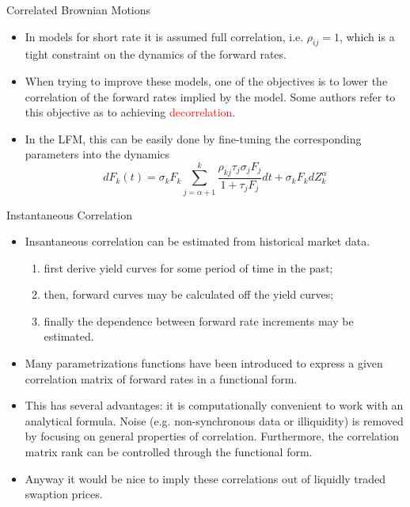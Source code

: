 \documentclass{beamer}
\begin{document}
\begin{frame}{Correlated Brownian Motions}
	\begin{itemize}
		\item In models for short rate it is assumed full correlation, i.e. $\rho_{ij}=1$, which is a tight constraint on the dynamics of the forward rates.
		\item When trying to improve these models, one of the objectives is to lower the correlation of the forward rates implied by the model. Some authors refer to this objective as to achieving \textcolor{red}{decorrelation}. 
		\item In the LFM, this can be easily done by fine-tuning the corresponding parameters into the dynamics 
\begin{equation*}
dF_k(t) = \sigma_kF_k\sum_{j=\alpha+1}^k\frac{\boxed{\rho_{kj}}\tau_j\sigma_jF_j}{1+\tau_jF_j}dt+\sigma_kF_k dZ^\alpha_k
		\end{equation*}
	\end{itemize}
\end{frame}

\begin{frame}{Instantaneous Correlation}
  \begin{itemize}    
  \item<1-> Insantaneous correlation can be estimated from historical market data.
  \begin{enumerate}
	  \item first derive yield curves for some period of time in the past;
	  \item then, forward curves may be calculated off the yield curves;
	  \item finally the dependence between forward rate increments may be estimated. 
  \end{enumerate}
  \item<2-> Many parametrizations functions have been introduced to express a given correlation matrix of forward rates in a functional form.
  \item<3-> This has several advantages: it is computationally convenient to work with an analytical formula. Noise (e.g. non-synchronous data or illiquidity) is removed by focusing on general properties of correlation. Furthermore, the correlation matrix rank can be controlled through the functional form.
  \item<4-> Anyway it would be nice to imply these correlations out of liquidly traded swaption prices. 
  \end{itemize}
\end{frame}
\end{document}
